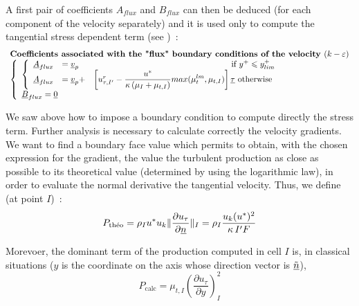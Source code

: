 A first pair of coefficients $A_{flux}$ and $B_{flux}$ can then be deduced
(for each component of the velocity separately) and it is used only
 to compute the tangential stress dependent term  (see )~:
\begin{equation}
\begin{array}{l}
\text{\bf Coefficients associated with  the "flux" boundary conditions of the velocity } (k-\varepsilon)\\
\left\{\begin{array}{l}
\left\{\begin{array}{llr}
\underline{A}_{flux}&=\underline{v}_p& \text{ if\ } y^+\leqslant y^+_{lim} \\
\underline{A}_{flux}&=\underline{v}_p+&\left[u^r_{\tau,I'}-\displaystyle\frac{u^*}{\kappa\,
(\mu_I+\mu_{t,I})} max(\mu_{t}^{lm},\mu_{t,I}) \right]\underline{\tau} \text{ otherwise }
\end{array}\right.  \\
\underline{B}_{flux} = \underline{0}
\end{array}\right.
\end{array}
\end{equation}

We saw above how to impose a boundary condition to compute directly the stress term.
Further analysis is necessary to calculate correctly the velocity gradients. We
want to find a boundary face value which permits to obtain,
with the chosen expression for the gradient,
 the value the turbulent production as close as possible to its theoretical value
(determined by using the logarithmic law), in order to evaluate the normal
derivative the tangential velocity.
Thus, we define (at point $I$)~:
\begin{equation}\label{Base_Clptur_eq_ptheo_clptur}
P_{\text{th\'eo}} = \rho_I u^* u_k
\|\displaystyle\frac{\partial u_\tau}{\partial\underline{n}}\|_{I} =
\rho_I \displaystyle\frac{u_k(u^*)^2}{\kappa\, I'F}
\end{equation}

Morevoer, the dominant term of the production computed in cell $I$ is,
in classical situations ($y$ is the coordinate on the axis
whose direction vector is $\underline{\tilde{n}}$),
\begin{equation}
P_{\text{calc}} =
\mu_{t,I}\left(\displaystyle\frac{\partial u_\tau}{\partial y}\right)^2_{I}
\end{equation}

